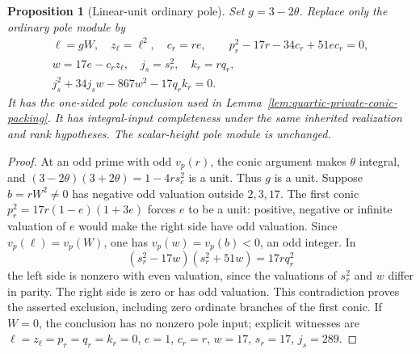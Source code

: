 \documentclass[11pt]{article}
\newtheorem{proposition}[theorem]{Proposition}
\theoremstyle{definition}
\theoremstyle{remark}
\begin{document}
\begin{proposition}[Linear-unit ordinary pole]
\label{lem:quartic-linear-pole}
Set $g=3-2\theta$. Replace only the ordinary pole module by
\begin{gather*}
 \ell=gW,\quad z_\ell=\ell^2,\quad c_r=re,\qquad
 p_r^2-17r-34c_r+51ec_r=0,\\
 w=17e-c_rz_\ell,\quad j_s=s_r^2,\quad k_r=rq_r,\\
 j_s^2+34j_sw-867w^2-17q_rk_r=0.
\end{gather*}
It has the one-sided pole conclusion used in
Lemma~\ref{lem:quartic-private-conic-packing}. It has integral-input
completeness under the same inherited realization and rank hypotheses.
The scalar-height pole module is unchanged.
\end{proposition}
\begin{proof}
At an odd prime with odd $v_p(r)$, the conic argument makes $\theta$
integral, and
$(3-2\theta)(3+2\theta)=1-4rs_c^2$ is a unit. Thus $g$ is a unit.
Suppose $b=rW^2\ne0$ has negative odd valuation outside $2,3,17$.
The first conic $p_r^2=17r(1-e)(1+3e)$ forces $e$ to be a unit: positive,
negative or infinite valuation of $e$ would make the right side have odd
valuation. Since $v_p(\ell)=v_p(W)$, one has
$v_p(w)=v_p(b)<0$, an odd integer. In
\[
 (s_r^2-17w)(s_r^2+51w)=17rq_r^2
\]
the left side is nonzero with even valuation, since the valuations of
$s_r^2$ and $w$ differ in parity. The right side is zero or has odd
valuation. This contradiction proves the asserted exclusion, including
zero ordinate branches of the first conic. If $W=0$, the conclusion has
no nonzero pole input; explicit witnesses are
$\ell=z_\ell=p_r=q_r=k_r=0$, $e=1$, $c_r=r$, $w=17$, $s_r=17$, $j_s=289$.


\end{proof}
\end{document}
